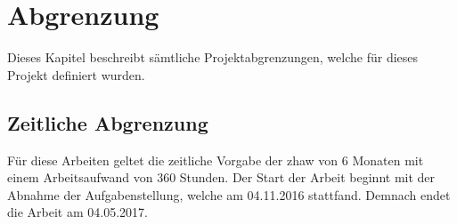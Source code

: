 %
%				


\section{Abgrenzung}
\label{sec:einleitung:abgrenzung}
Dieses Kapitel beschreibt sämtliche Projektabgrenzungen, welche für dieses Projekt definiert
wurden.

\subsection{Zeitliche Abgrenzung}
Für diese Arbeiten geltet die zeitliche Vorgabe der \gls{zhaw} von 6 Monaten mit einem Arbeitsaufwand von 360 Stunden.
Der Start der Arbeit beginnt mit der Abnahme der Aufgabenstellung, welche am 04.11.2016 stattfand.
Demnach endet die Arbeit am 04.05.2017.

